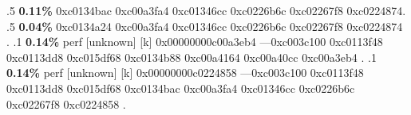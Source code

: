 \begin{profile}
{.5 \textbf{0.11\%} 0xc0134bac\newline {} 0xc00a3fa4\newline {} 0xc01346cc\newline {} 0xc0226b6c\newline {} 0xc02267f8\newline {} 0xc0224874. 
.5 \textbf{0.04\%} 0xc0134a24\newline {} 0xc00a3fa4\newline {} 0xc01346cc\newline {} 0xc0226b6c\newline {} 0xc02267f8\newline {} 0xc0224874\newline {} . 
.1 \textbf{ 0.14\%} perf             [unknown]              [k] 0x00000000c00a3eb4\newline {} ---0xc003c100\newline {} 0xc0113f48\newline {} 0xc0113dd8\newline {} 0xc015df68\newline {} 0xc0134b88\newline {} 0xc00a4164\newline {} 0xc00a40cc\newline {} 0xc00a3eb4\newline {} . 
.1 \textbf{ 0.14\%} perf             [unknown]              [k] 0x00000000c0224858\newline {} ---0xc003c100\newline {} 0xc0113f48\newline {} 0xc0113dd8\newline {} 0xc015df68\newline {} 0xc0134bac\newline {} 0xc00a3fa4\newline {} 0xc01346cc\newline {} 0xc0226b6c\newline {} 0xc02267f8\newline {} 0xc0224858\newline {} . 
}
\end{profile}
